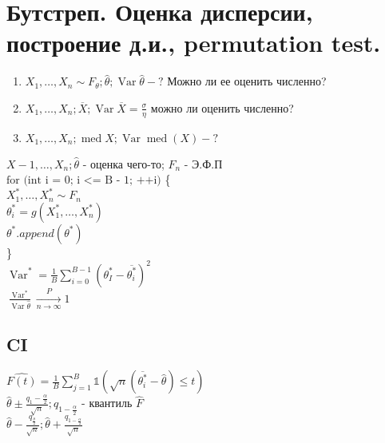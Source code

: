 \documentclass{article}
\newcommand\0{\mathbb{0}}
\DeclareMathOperator{\Var}{Var}
\DeclareMathOperator{\med}{med}
\newcommand\1{\mathbb{1}}
\newcommand{\xrto}{\xrightarrow}
\begin{document}
\section{Бутстреп. Оценка дисперсии, построение д.и., permutation test.}
\begin{enumerate}
    \item $X_1, \dots, X_n \sim F_{\theta}; \widehat{\theta}; \Var \widehat{\theta} - ?$ Можно ли ее оценить численно?
    \item $X_1, \dots, X_n; \overline{X}; \Var \overline{X} = \frac{\sigma}{\eta}$ можно ли оценить численно?
    \item $X_1, \dots, X_n; \med X; \Var \med(X) - ?$\\
\end{enumerate}
$X-1, \dots, X_n; \widehat{\theta}$ - оценка чего-то; $F_n$ - Э.Ф.П\\
$\text{for (int i = 0; i <= B - 1; ++i)}$ \{\\
\text{  }$X_1^*, \dots, X_n^* \sim F_n$\\
\text{  }$\theta_i^* = g(X_1^*, \dots, X_n^*)$\\
\text{  }$\theta^*.append(\theta^*)$\\
\}\\
$\Var^* = \frac{1}{B} \displaystyle\sum_{i = 0}^{B - 1}(\theta_I^* - \overline{\theta_i^*})^2$\\
$\frac{\Var^*}{\Var \widehat{\theta}} \xrto[n \to \infty]{P} 1$\\
\subsection{CI}
$\widehat{F(t)} = \frac{1}{B}\displaystyle\sum_{j = 1}^{B} \mathbb{1}(\sqrt{n}(\overline{\theta_i^*} - \widehat{\theta}) \leq t)$\\
$\widehat{\theta} \pm \frac{q_1 - \frac{\alpha}{2}}{\sqrt{n}}; q_{1 - \frac{\alpha}{2}}$ - квантиль $\widehat{F}$\\
$\widehat{\theta} - \frac{q_{\frac{\theta}{2}}}{\sqrt{n}}; \widehat{\theta} + \frac{q_{1 - \frac{\alpha}{2}}}{\sqrt{n}}$
\end{document}
